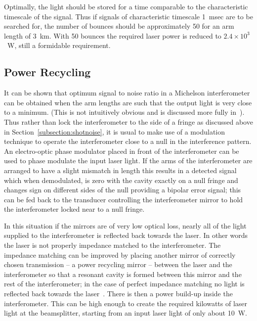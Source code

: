 \documentclass{article}
\begin{document}
Optimally, the light should be stored for a time comparable to the
characteristic timescale of the signal. Thus if signals of
characteristic timescale 1~msec are to be searched for, the number of
bounces should be approximately 50 for an arm length of 3~km. With 50
bounces the required laser power is reduced to $2.4 \times 10^3$~W,
still a formidable requirement. 




\subsection{Power Recycling}
\label{subsection:powerrec}

It can be shown that optimum signal to noise ratio in a Michelson
interferometer can be obtained when the arm lengths are such that the
output light is very close to a minimum. (This is not intuitively
obvious and is discussed more fully in~\cite{Edelstein}). Thus rather
than lock the interferometer to the side of a fringe as discussed
above in Section~\ref{subsection:shotnoise}, it is usual to make use of a
modulation technique to operate the interferometer close to a null in
the interference pattern. An electro-optic phase modulator placed in
front of the interferometer can be used to phase modulate the input
laser light. If the arms of the interferometer are arranged to have a
slight mismatch in length this results in a detected signal which when
demodulated, is zero with the cavity exactly on a null fringe and
changes sign on different sides of the null providing a bipolar error
signal; this can be fed back to the transducer controlling the
interferometer mirror to hold the interferometer locked near to a null
fringe.
        
In this situation if the mirrors are of very low optical loss, nearly
all of the light supplied to the interferometer is reflected back
towards the laser. In other words the laser is not properly impedance
matched to the interferometer. The impedance matching can be improved
by placing another mirror of correctly chosen transmission -- a power
recycling mirror -- between the laser and the interferometer so that a
resonant cavity is formed between this mirror and the rest of the
interferometer; in the case of perfect impedance matching no light is
reflected back towards the laser~\cite{Drever3, Schilling}. There is
then a power build-up inside the interferometer. This can
be high enough to create the required kilowatts of laser light at the
beamsplitter, starting from an input laser light of only about 10~W.
\end{document}
